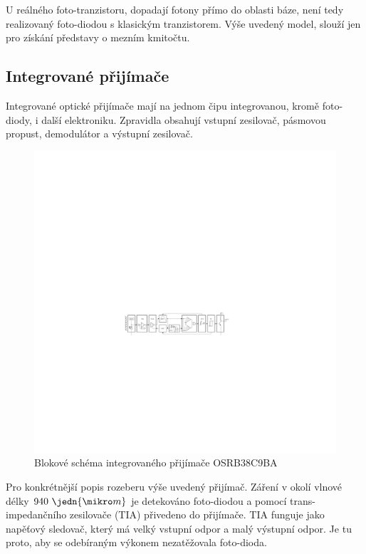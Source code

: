 U reálného foto-tranzistoru, dopadají fotony přímo do oblasti báze, není tedy realizovaný foto-diodou s klasickým tranzistorem. Výše uvedený model, slouží jen pro získání představy o mezním kmitočtu.

\subsection{Integrované přijímače}
Integrované optické přijímače mají na jednom čipu integrovanou, kromě foto-diody, i další elektroniku. Zpravidla obsahují vstupní zesilovač, pásmovou propust, demodulátor a výstupní zesilovač.

\begin{figure}[H]
    \begin{center}
        \includegraphics[width=\textwidth]{img/ir-rx}
    \end{center}
    \caption{Blokové schéma integrovaného přijímače OSRB38C9BA}
\end{figure}

Pro konkrétnější popis rozeberu výše uvedený přijímač. Záření v okolí vlnové délky $940~\jedn{\mikro m}$ je detekováno foto-diodou a pomocí trans-impedančního zesilovače (TIA) přivedeno do přijímače. TIA funguje jako napěťový sledovač, který má velký vstupní odpor a malý výstupní odpor. Je tu proto, aby se odebíraným výkonem nezatěžovala foto-dioda.

